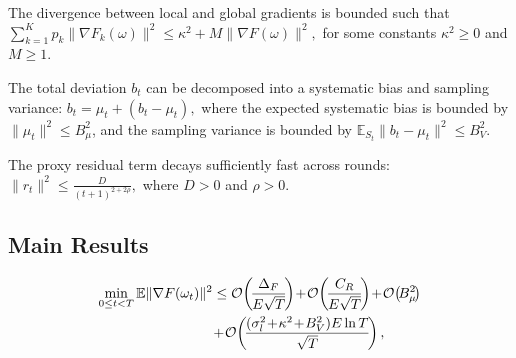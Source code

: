 \begin{assumption}\label{ass:data-heterogeneity}
The divergence between local and global gradients is bounded such that
$\sum_{k=1}^K p_k \|\nabla F_k(\omega)\|^2 \le \kappa^2 + M\|\nabla F(\omega)\|^2,$
for some constants $\kappa^2 \ge 0$ and $M \ge 1$.
\end{assumption}

\begin{assumption}\label{ass:bias-decoupling}
The total deviation $b_t$ can be decomposed into a systematic bias and sampling variance:
$b_t = \mu_t + (b_t - \mu_t),$
where the expected systematic bias is bounded by $\|\mu_t\|^2 \le B_\mu^2$, and the sampling variance is bounded by
$\mathbb{E}_{S_t}\|b_t - \mu_t\|^2 \le B_V^2.$
\end{assumption}

\begin{assumption}\label{ass:residual-decay}
The proxy residual term decays sufficiently fast across rounds:
$\|r_t\|^2 \le \frac{D}{(t+1)^{2+2\rho}},$
where $D > 0$ and $\rho > 0$.
\end{assumption}

\subsection{Main Results}


\begin{theorem}
\begin{align}
\min_{0 \le t < T} \mathbb{E}\|\nabla F(\omega_t)\|^2
&\le \mathcal{O}\!\left(\!\frac{\Delta_F}{E\sqrt{T}}\!\right)\!+\!\mathcal{O}\!\left(\!\frac{C_R}{E\sqrt{T}}\!\right)
\!+\!\mathcal{O}\!\left(\!B_\mu^2\!\right) \notag \\
&\!+\!\mathcal{O}\!\left(\!\frac{(\sigma_l^2\!+\!\kappa^2\!+\!B_V^2)E\ln T}{\sqrt{T}}\!\right),
\end{align}
\end{theorem}

